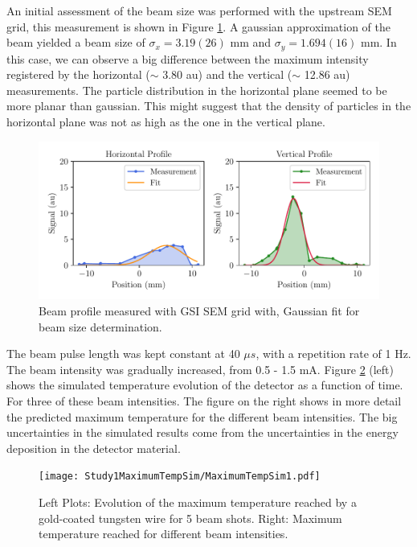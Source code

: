 An initial assessment of the beam size was performed with the upstream SEM grid, this measurement is shown in Figure \ref{fig:BeamProfileStudy1}. A gaussian approximation of the beam yielded a beam size of $\sigma_x = 3.19(26)$ mm and $\sigma_y = 1.694(16)$ mm. In this case, we can observe a big difference between the maximum intensity registered by the horizontal ($\sim$ 3.80 au) and the vertical ($\sim$ 12.86 au) measurements. The particle distribution in the horizontal plane seemed to be more planar than gaussian. This might suggest that the density of particles in the horizontal plane was not as high as the one in the vertical plane. 

\begin{figure}[h]
    \centering
    \includegraphics[width=1.0\columnwidth]{ThermalStudyBeamProfile1/ProfileMeasurementStudy1.pdf}
    \caption{Beam profile measured with GSI SEM grid with, Gaussian fit for beam size determination.}
    \label{fig:BeamProfileStudy1}
\end{figure}

The beam pulse length was kept constant at 40 $\mu s$, with a repetition rate of 1 Hz. The beam intensity was gradually increased, from 0.5 - 1.5 mA. Figure \ref{fig:MaxTempStudy1} (left) shows the simulated temperature evolution of the detector as a function of time. For three of these beam intensities. The figure on the right shows in more detail the predicted maximum temperature for the different beam intensities. The big uncertainties in the simulated results come from the uncertainties in the energy deposition in the detector material.

\begin{figure}[h]
    \centering
    \texttt{[image: Study1MaximumTempSim/MaximumTempSim1.pdf]}
    \caption{Left Plots: Evolution of the maximum temperature reached by a gold-coated tungsten wire for 5 beam shots. Right: Maximum temperature reached for different beam intensities. }
    \label{fig:MaxTempStudy1}
\end{figure}

